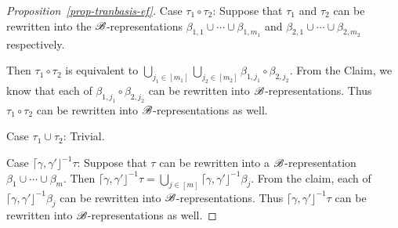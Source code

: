 \begin{proof}[Proposition~\ref{prop-tranbasis-ef}]
	
	Case $\tau_1 \circ \tau_2$: Suppose that  $\tau_1$ and $\tau_2$ can be rewritten into the ${\mathscr{B} }$-representations $ \beta_{1,1} \cup \cdots \cup \beta_{1, m_1}$ and $\beta_{2,1} \cup \cdots \cup \beta_{2, m_2}$  respectively.
	
	Then $\tau_1 \circ \tau_2$ is equivalent to $\bigcup \limits_{j_1 \in [m_1]} \bigcup \limits_{j_2 \in [m_2]} \beta_{1, j_1} \circ \beta_{2, j_2}$. From the Claim, we know that each of $ \beta_{1, j_1} \circ \beta_{2, j_2}$ can be rewritten into ${\mathscr{B} }$-representations. Thus $\tau_1 \circ \tau_2$ can be rewritten into ${\mathscr{B} }$-representations as well.
	
	Case $\tau_1 \cup \tau_2$: Trivial.
	
	Case $\lceil \gamma, \gamma' \rfloor^{-1} \tau$: Suppose that $\tau$ can be rewritten into a ${\mathscr{B} }$-representation $ \beta_{1} \cup \cdots \cup \beta_{m}$. 
	Then $\lceil \gamma, \gamma' \rfloor^{-1} \tau = \bigcup \limits_{j \in [m]} \lceil \gamma, \gamma' \rfloor^{-1} \beta_j$. From the claim, each of $\lceil \gamma, \gamma' \rfloor^{-1} \beta_j$ can be rewritten into ${\mathscr{B} }$-representations. Thus $\lceil \gamma, \gamma' \rfloor^{-1} \tau$ can be rewritten into ${\mathscr{B} }$-representations as well.
\end{proof}

